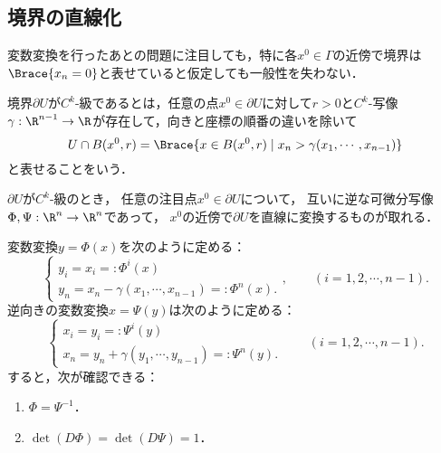 \documentclass[uplatex,dvipdfmx]{jsreport}
\begin{document}
\subsection{境界の直線化}

\begin{tcolorbox}[colframe=ForestGreen, colback=ForestGreen!10!white,breakable,colbacktitle=ForestGreen!40!white,coltitle=black,fonttitle=\bfseries\sffamily,
title=]
    変数変換を行ったあとの問題に注目しても，特に各$x^0\in\Gamma$の近傍で境界は$\Brace{x_n=0}$と表せていると仮定しても一般性を失わない．
\end{tcolorbox}

\begin{definition}[境界の滑らかさ]
    境界$\partial U$が$C^k$-級であるとは，任意の点$x^0\in\partial U$に対して$r>0$と$C^k$-写像$\gamma:\R^{n-1}\to\R$が存在して，向きと座標の順番の違いを除いて
    \[U\cap B(x^0,r)=\Brace{x\in B(x^0,r)\mid x_n>\gamma(x_1,\cdots,x_{n-1})}\]
    と表せることをいう．
\end{definition}

\begin{lemma}[境界上での変数変換]
    $\partial U$が$C^k$-級のとき，
    任意の注目点$x^0\in\partial U$について，
    互いに逆な可微分写像$\Phi,\Psi:\R^n\to\R^n$であって，
    $x^0$の近傍で$\partial U$を直線に変換するものが取れる．
\end{lemma}
\begin{Proof}
    変数変換$y=\Phi(x)$を次のように定める：
    \[\begin{cases}
        y_i=x_i=:\Phi^i(x)\\
        y_n=x_n-\gamma(x_1,\cdots,x_{n-1})=:\Phi^n(x).
    \end{cases},\qquad(i=1,2,\cdots,n-1).\]
    逆向きの変数変換$x=\Psi(y)$は次のように定める：
    \[\begin{cases}
        x_i=y_i=:\Psi^i(y)\\
        x_n=y_n+\gamma(y_1,\cdots,y_{n-1})=:\Psi^n(y).
    \end{cases}\qquad(i=1,2,\cdots,n-1).\]
    すると，次が確認できる：
    \begin{enumerate}
        \item $\Phi=\Psi^{-1}$．
        \item $\det(D\Phi)=\det(D\Psi)=1$．
    \end{enumerate}
\end{Proof}
\end{document}
